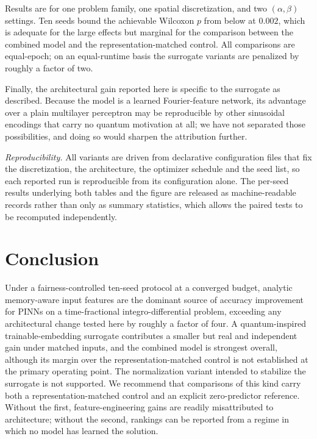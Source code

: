 \documentclass[journal]{IEEEtran}
\begin{document}
Results are for one problem family, one spatial discretization, and two
$(\alpha,\beta)$ settings. Ten seeds bound the achievable Wilcoxon $p$ from below
at $0.002$, which is adequate for the large effects but marginal for the
comparison between the combined model and the representation-matched control. All
comparisons are equal-epoch; on an equal-runtime basis the surrogate variants are
penalized by roughly a factor of two.

Finally, the architectural gain reported here is specific to the surrogate as
described. Because the model is a learned Fourier-feature network, its advantage
over a plain multilayer perceptron may be reproducible by other sinusoidal
encodings that carry no quantum motivation at all; we have not separated those
possibilities, and doing so would sharpen the attribution further.

\emph{Reproducibility.} All variants are driven from declarative configuration
files that fix the discretization, the architecture, the optimizer schedule and
the seed list, so each reported run is reproducible from its configuration alone.
The per-seed results underlying both tables and the figure are released as
machine-readable records rather than only as summary statistics, which allows the
paired tests to be recomputed independently.

\section{Conclusion}
Under a fairness-controlled ten-seed protocol at a converged budget, analytic
memory-aware input features are the dominant source of accuracy improvement for
PINNs on a time-fractional integro-differential problem, exceeding any
architectural change tested here by roughly a factor of four. A quantum-inspired
trainable-embedding surrogate contributes a smaller but real and independent gain
under matched inputs, and the combined model is strongest overall, although its
margin over the representation-matched control is not established at the primary
operating point. The normalization variant intended to stabilize the surrogate is
not supported. We recommend that comparisons of this kind carry both a
representation-matched control and an explicit zero-predictor reference. Without
the first, feature-engineering gains are readily misattributed to architecture;
without the second, rankings can be reported from a regime in which no model has
learned the solution.



\end{document}
